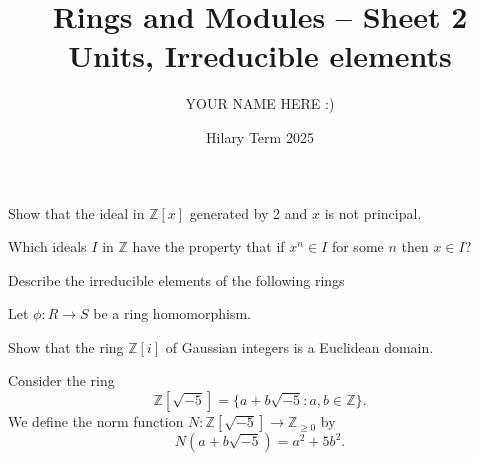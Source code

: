 \documentclass[answers]{exam}
\title{Rings and Modules -- Sheet 2\\Units, Irreducible elements}
\author{YOUR NAME HERE :)}
\date{Hilary Term 2025}
\begin{document}
\maketitle

\begin{questions}

\question%
Show that the ideal in $\mathbb{Z}[x]$ generated by 2 and $x$ is not principal.



\question%
Which ideals $I$ in $\mathbb{Z}$ have the property that if $x^{n} \in I$ for some $n$ then $x \in I$?



\question%
Describe the irreducible elements of the following rings



\question%
Let $\phi: R \to S$ be a ring homomorphism.



\question%
Show that the ring $\mathbb{Z}[i]$ of Gaussian integers is a Euclidean domain.



\question%
Consider the ring \[
	\mathbb{Z}[\sqrt{-5}]=\{a+b \sqrt{-5}: a, b \in \mathbb{Z}\}.
\] We define the norm function $N: \mathbb{Z}[\sqrt{-5}] \to \mathbb{Z}_{\geq 0}$ by \[
	N(a+b \sqrt{-5})=a^{2}+5 b^{2} .
\]
\begin{parts}

\end{parts}
\end{questions}
\end{document}
